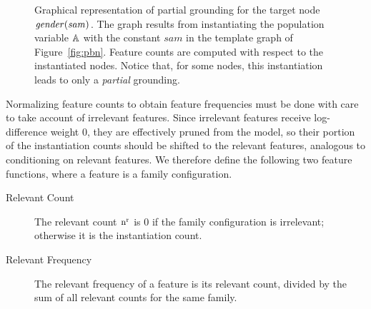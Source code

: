 \documentclass[twoside,11pt]{article}
\newcommand{\point}[1]{\noindent\emph{#1}.}
\begin{document}
\begin{figure}
\vspace{-0.5cm}
\begin{center}
\caption{Graphical representation of partial grounding for the target node $\it{gender}(sam)$. The graph results from instantiating the population variable $\mathbb{A}$ with the constant $sam$ in the template graph of Figure~\ref{fig:pbn}. Feature counts are computed with respect to the instantiated nodes. Notice that, for some nodes, this instantiation leads to only a {\em partial} grounding.
\label{fig:regress}}
\end{center}
\end{figure}

Normalizing feature counts to obtain feature frequencies must be done with care to take account of irrelevant features. Since irrelevant features receive log-difference weight 0, they are effectively pruned from the model, so their portion of the instantiation counts should be shifted to the relevant features, analogous to conditioning on relevant features. We therefore define the following two feature functions, where a feature is a family configuration.





\begin{description}
\item[Relevant Count]  The relevant count $\mathrm{n}^{\mathrm{r}}$ is 0 if the family configuration is irrelevant; otherwise it is the instantiation count.
\item[Relevant Frequency] The relevant frequency of a feature is its relevant count, divided by the sum of all relevant counts for the same family.
\end{description}
\end{document}
